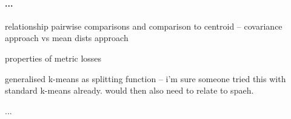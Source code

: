 \documentclass[
    a4paper, %
	fontsize=10pt, %
	twoside=false, %
]{kaobook}
\begin{document}
\paragraph{...}

relationship pairwise comparisons and comparison to centroid -- covariance approach vs mean dists approach

properties of metric losses

generalised k-means as splitting function -- i'm sure someone tried this with standard k-means already. would then also need to relate to spaeh.

...


\backmatter %



\printbibliography[heading=bibintoc, title=Bibliography, prenote=bibnote] %



\printindex %
\end{document}

